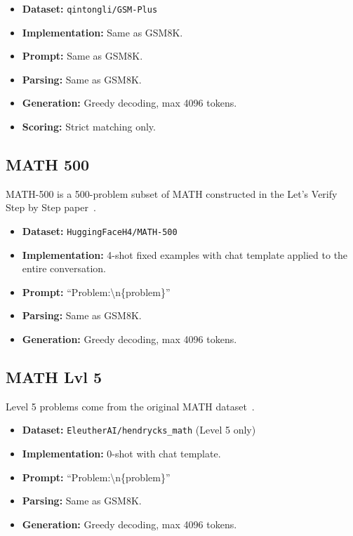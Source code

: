 \documentclass{article}
\begin{document}
\begin{itemize}
    \item \textbf{Dataset:} \texttt{qintongli/GSM-Plus}
    \item \textbf{Implementation:} Same as GSM8K.
    \item \textbf{Prompt:} Same as GSM8K.
    \item \textbf{Parsing:} Same as GSM8K.
    \item \textbf{Generation:} Greedy decoding, max 4096 tokens.
    \item \textbf{Scoring:} Strict matching only.
\end{itemize}

\subsection*{MATH 500}

MATH-500 is a 500-problem subset of MATH constructed in the Let’s Verify Step by Step paper~\citep{lightman2023letsverify}.

\begin{itemize}
    \item \textbf{Dataset:} \texttt{HuggingFaceH4/MATH-500}
    \item \textbf{Implementation:} 4-shot fixed examples with chat template applied to the entire conversation.
    \item \textbf{Prompt:} ``Problem:\textbackslash n\{problem\}''
    \item \textbf{Parsing:} Same as GSM8K.
    \item \textbf{Generation:} Greedy decoding, max 4096 tokens.
\end{itemize}

\subsection*{MATH Lvl 5}

Level 5 problems come from the original MATH dataset~\citep{hendrycks2021math}.

\begin{itemize}
    \item \textbf{Dataset:} \texttt{EleutherAI/hendrycks\_math} (Level 5 only)
    \item \textbf{Implementation:} 0-shot with chat template.
    \item \textbf{Prompt:} ``Problem:\textbackslash n\{problem\}''
    \item \textbf{Parsing:} Same as GSM8K.
    \item \textbf{Generation:} Greedy decoding, max 4096 tokens.

\end{itemize}
\end{document}
